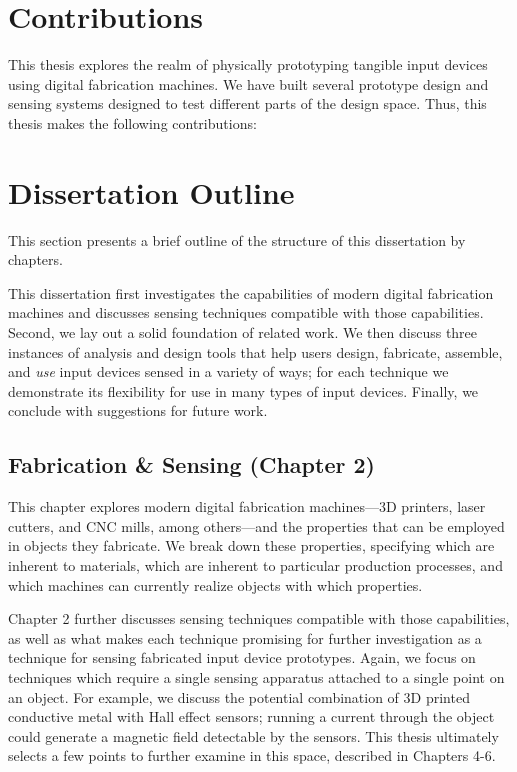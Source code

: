 \section{Contributions}

This thesis explores the realm of physically prototyping tangible input devices using digital fabrication machines. We have built several prototype design and sensing systems designed to test different parts of the design space. Thus, this thesis makes the following contributions:



\section{Dissertation Outline}

This section presents a brief outline of the structure of this dissertation by chapters.

This dissertation first investigates the capabilities of modern digital fabrication machines and discusses sensing techniques compatible with those capabilities. Second, we lay out a solid foundation of related work. We then discuss three instances of analysis and design tools that help users design, fabricate, assemble, and \emph{use} input devices sensed in a variety of ways; for each technique we demonstrate its flexibility for use in many types of input devices. Finally, we conclude with suggestions for future work.

\subsection{Fabrication \& Sensing (Chapter 2)}

This chapter explores modern digital fabrication machines---3D printers, laser cutters, and CNC mills, among others---and the properties that can be employed in objects they fabricate. We break down these properties, specifying which are inherent to materials, which are inherent to particular production processes, and which machines can currently realize objects with which properties.

Chapter 2 further discusses sensing techniques compatible with those capabilities, as well as what makes each technique promising for further investigation as a technique for sensing fabricated input device prototypes. Again, we focus on techniques which require a single sensing apparatus attached to a single point on an object. For example, we discuss the potential combination of 3D printed conductive metal with Hall effect sensors; running a current through the object could generate a magnetic field detectable by the sensors. This thesis ultimately selects a few points to further examine in this space, described in Chapters 4-6.

